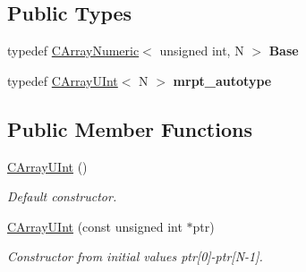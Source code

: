 \subsection*{Public Types}
\begin{DoxyCompactItemize}
\item 
typedef \hyperlink{classydlidar_1_1math_1_1_c_array_numeric}{C\+Array\+Numeric}$<$ unsigned int, N $>$ {\bfseries Base}\hypertarget{classydlidar_1_1math_1_1_c_array_u_int_aa2f12e18a94de600b9c4a4282cc2e5b4}{}\label{classydlidar_1_1math_1_1_c_array_u_int_aa2f12e18a94de600b9c4a4282cc2e5b4}

\item 
typedef \hyperlink{classydlidar_1_1math_1_1_c_array_u_int}{C\+Array\+U\+Int}$<$ N $>$ {\bfseries mrpt\+\_\+autotype}\hypertarget{classydlidar_1_1math_1_1_c_array_u_int_a6bb9a3399eb1e94c0cd9083f4db9347b}{}\label{classydlidar_1_1math_1_1_c_array_u_int_a6bb9a3399eb1e94c0cd9083f4db9347b}

\end{DoxyCompactItemize}
\subsection*{Public Member Functions}
\begin{DoxyCompactItemize}
\item 
\hyperlink{classydlidar_1_1math_1_1_c_array_u_int_a5082b0f82df32d3015e53ee40361d978}{C\+Array\+U\+Int} ()\hypertarget{classydlidar_1_1math_1_1_c_array_u_int_a5082b0f82df32d3015e53ee40361d978}{}\label{classydlidar_1_1math_1_1_c_array_u_int_a5082b0f82df32d3015e53ee40361d978}

\begin{DoxyCompactList}\small\item\em Default constructor. \end{DoxyCompactList}\item 
\hyperlink{classydlidar_1_1math_1_1_c_array_u_int_a6f7278d6fbcc3d913cfa2d219ee75b53}{C\+Array\+U\+Int} (const unsigned int $\ast$ptr)\hypertarget{classydlidar_1_1math_1_1_c_array_u_int_a6f7278d6fbcc3d913cfa2d219ee75b53}{}\label{classydlidar_1_1math_1_1_c_array_u_int_a6f7278d6fbcc3d913cfa2d219ee75b53}

\begin{DoxyCompactList}\small\item\em Constructor from initial values ptr\mbox{[}0\mbox{]}-\/ptr\mbox{[}N-\/1\mbox{]}. \end{DoxyCompactList}\end{DoxyCompactItemize}


